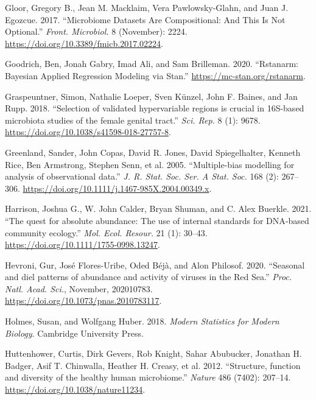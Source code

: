 \documentclass[
]{article}
\newlength{\cslhangindent}
\newlength{\cslentryspacingunit} %
\newenvironment{CSLReferences}[2] %
 {%
  \setlength{\parindent}{0pt}
  \ifodd #1
  \let\oldpar\par
  \def\par{\hangindent=\cslhangindent\oldpar}
  \fi
  \setlength{\parskip}{#2\cslentryspacingunit}
 }%
 {}
\begin{document}
\begin{CSLReferences}{1}{0}
\leavevmode{}%
Gloor, Gregory B., Jean M. Macklaim, Vera Pawlowsky-Glahn, and Juan J. Egozcue. 2017. {``{Microbiome Datasets Are Compositional: And This Is Not Optional}.''} \emph{Front. Microbiol.} 8 (November): 2224. \url{https://doi.org/10.3389/fmicb.2017.02224}.

\leavevmode{}%
Goodrich, Ben, Jonah Gabry, Imad Ali, and Sam Brilleman. 2020. {``Rstanarm: {Bayesian} Applied Regression Modeling via {Stan}.''} \url{https://mc-stan.org/rstanarm}.

\leavevmode{}%
Graspeuntner, Simon, Nathalie Loeper, Sven Künzel, John F. Baines, and Jan Rupp. 2018. {``{Selection of validated hypervariable regions is crucial in 16S-based microbiota studies of the female genital tract}.''} \emph{Sci. Rep.} 8 (1): 9678. \url{https://doi.org/10.1038/s41598-018-27757-8}.

\leavevmode{}%
Greenland, Sander, John Copas, David R. Jones, David Spiegelhalter, Kenneth Rice, Ben Armstrong, Stephen Senn, et al. 2005. {``{Multiple-bias modelling for analysis of observational data}.''} \emph{J. R. Stat. Soc. Ser. A Stat. Soc.} 168 (2): 267--306. \url{https://doi.org/10.1111/j.1467-985X.2004.00349.x}.

\leavevmode{}%
Harrison, Joshua G., W. John Calder, Bryan Shuman, and C. Alex Buerkle. 2021. {``{The quest for absolute abundance: The use of internal standards for DNA‐based community ecology}.''} \emph{Mol. Ecol. Resour.} 21 (1): 30--43. \url{https://doi.org/10.1111/1755-0998.13247}.

\leavevmode{}%
Hevroni, Gur, José Flores-Uribe, Oded Béjà, and Alon Philosof. 2020. {``{Seasonal and diel patterns of abundance and activity of viruses in the Red Sea}.''} \emph{Proc. Natl. Acad. Sci.}, November, 202010783. \url{https://doi.org/10.1073/pnas.2010783117}.

\leavevmode{}%
Holmes, Susan, and Wolfgang Huber. 2018. \emph{Modern Statistics for Modern Biology}. Cambridge University Press.

\leavevmode{}%
Huttenhower, Curtis, Dirk Gevers, Rob Knight, Sahar Abubucker, Jonathan H. Badger, Asif T. Chinwalla, Heather H. Creasy, et al. 2012. {``{Structure, function and diversity of the healthy human microbiome}.''} \emph{Nature} 486 (7402): 207--14. \url{https://doi.org/10.1038/nature11234}.


\end{CSLReferences}
\end{document}
